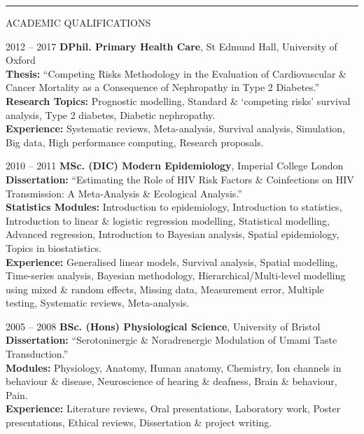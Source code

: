 \documentclass[10pt,a4paper]{article}
\begin{document}
\noindent\rule{\textwidth}{0.4pt}
\begin{cvlist}{ACADEMIC QUALIFICATIONS}
	
	\item[2012 -- 2017]
	\textbf{DPhil. Primary Health Care}, St Edmund Hall, University of Oxford \\
	\textbf{Thesis:} ``Competing Risks Methodology in the Evaluation of Cardiovascular \& Cancer Mortality as a Consequence of Nephropathy in Type 2 Diabetes.'' \\
	\textbf{Research Topics:} Prognostic modelling, Standard \& `competing risks' survival analysis, Type 2 diabetes, Diabetic nephropathy. \\
	\textbf{Experience:} Systematic reviews, Meta-analysis, Survival analysis, Simulation, Big data, High performance computing, Research proposals.
	
	\item[2010 -- 2011]
	\textbf{MSc. (DIC) Modern Epidemiology}, Imperial College London \\
	\textbf{Dissertation:} ``Estimating the Role of HIV Risk Factors \& Coinfections on HIV Transmission: A Meta-Analysis \& Ecological Analysis.'' \\
	\textbf{Statistics Modules:} Introduction to epidemiology, Introduction to statistics, Introduction to linear \& logistic regression modelling, Statistical modelling, Advanced regression, Introduction to Bayesian analysis, Spatial epidemiology, Topics in biostatistics. \\
	\textbf{Experience:} Generalised linear models, Survival analysis, Spatial modelling, Time-series analysis, Bayesian methodology, Hierarchical/Multi-level modelling using mixed \& random effects, Missing data, Measurement error, Multiple testing, Systematic reviews, Meta-analysis.
	
	\item[2005 -- 2008]
	\textbf{BSc. (Hons) Physiological Science}, University of Bristol \\
	\textbf{Dissertation:} ``Serotoninergic \& Noradrenergic Modulation of Umami Taste Transduction.'' \\
	\textbf{Modules:} Physiology, Anatomy, Human anatomy, Chemistry, Ion channels in behaviour \& disease, Neuroscience of hearing \& deafness, Brain \& behaviour, Pain. \\
	\textbf{Experience:} Literature reviews, Oral presentations, Laboratory work, Poster presentations, Ethical reviews, Dissertation \& project writing.
	
\end{cvlist}
\end{document}
